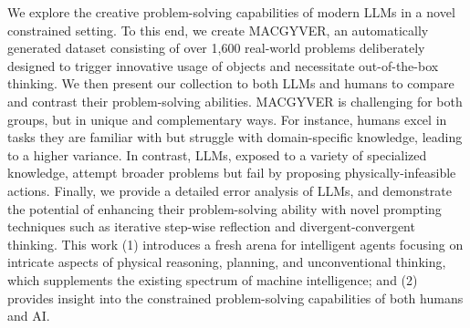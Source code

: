 We explore the creative problem-solving capabilities of modern LLMs in a novel constrained setting. To this end, we create MACGYVER, an automatically generated dataset consisting of over 1,600 real-world problems deliberately designed to trigger innovative usage of objects and necessitate out-of-the-box thinking. We then present our collection to both LLMs and humans to compare and contrast their problem-solving abilities. MACGYVER is challenging for both groups, but in unique and complementary ways. For instance, humans excel in tasks they are familiar with but struggle with domain-specific knowledge, leading to a higher variance. In contrast, LLMs, exposed to a variety of specialized knowledge, attempt broader problems but fail by proposing physically-infeasible actions. Finally, we provide a detailed error analysis of LLMs, and demonstrate the potential of enhancing their problem-solving ability with novel prompting techniques such as iterative step-wise reflection and divergent-convergent thinking. This work (1) introduces a fresh arena for intelligent agents focusing on intricate aspects of physical reasoning, planning, and unconventional thinking, which supplements the existing spectrum of machine intelligence; and (2) provides insight into the constrained problem-solving capabilities of both humans and AI.